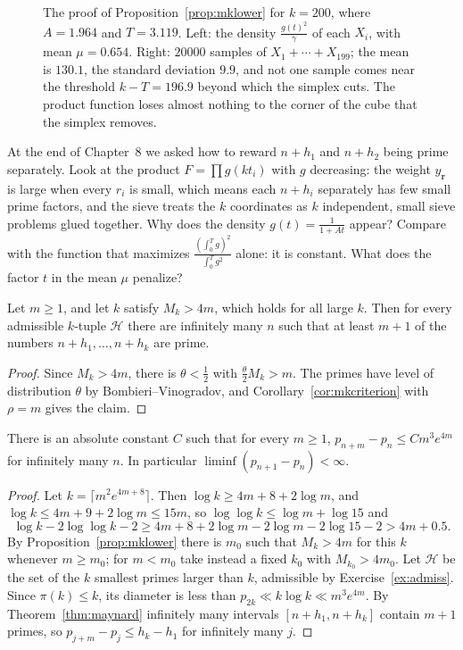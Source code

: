 \begin{figure}[ht]
\centering
{}
\caption{The proof of Proposition~\ref{prop:mklower} for $k=200$, where $A=1.964$ and $T=3.119$. Left: the density $\frac{g(t)^2}\gamma$ of each $X_i$, with mean $\mu=0.654$. Right: $20000$ samples of $X_1+\cdots+X_{199}$; the mean is $130.1$, the standard deviation $9.9$, and not one sample comes near the threshold $k-T=196.9$ beyond which the simplex cuts. The product function loses almost nothing to the corner of the cube that the simplex removes.}
\label{fig:chance}
\end{figure}

\begin{think}
At the end of Chapter~8 we asked how to reward $n+h_1$ and $n+h_2$ being prime separately. Look at the product $F=\prod g(kt_i)$ with $g$ decreasing: the weight $y_{\mathbf r}$ is large when every $r_i$ is small, which means each $n+h_i$ separately has few small prime factors, and the sieve treats the $k$ coordinates as $k$ independent, small sieve problems glued together. Why does the density $g(t)=\frac1{1+At}$ appear? Compare with the function that maximizes $\frac{(\int_0^Tg)^2}{\int_0^Tg^2}$ alone: it is constant. What does the factor $t$ in the mean $\mu$ penalize?
\end{think}

\begin{theorem}[Maynard, 2013]\label{thm:maynard}
Let $m\ge1$, and let $k$ satisfy $M_k>4m$, which holds for all large $k$. Then for every admissible $k$-tuple $\mathcal H$ there are infinitely many $n$ such that at least $m+1$ of the numbers $n+h_1,\dots,n+h_k$ are prime.
\end{theorem}
\begin{proof}
Since $M_k>4m$, there is $\theta<\frac12$ with $\frac\theta2M_k>m$. The primes have level of distribution $\theta$ by Bombieri--Vinogradov, and Corollary~\ref{cor:mkcriterion} with $\rho=m$ gives the claim.
\end{proof}

\begin{corollary}\label{cor:mprimes}
There is an absolute constant $C$ such that for every $m\ge1$, $p_{n+m}-p_n\le Cm^3e^{4m}$ for infinitely many $n$. In particular $\liminf(p_{n+1}-p_n)<\infty$.
\end{corollary}
\begin{proof}
Let $k=\lceil m^2e^{4m+8}\rceil$. Then $\log k\ge4m+8+2\log m$, and $\log k\le4m+9+2\log m\le15m$, so $\log\log k\le\log m+\log15$ and
\[
\log k-2\log\log k-2\ge4m+8+2\log m-2\log m-2\log15-2>4m+0.5.
\]
By Proposition~\ref{prop:mklower} there is $m_0$ such that $M_k>4m$ for this $k$ whenever $m\ge m_0$; for $m<m_0$ take instead a fixed $k_0$ with $M_{k_0}>4m_0$. Let $\mathcal H$ be the set of the $k$ smallest primes larger than $k$, admissible by Exercise~\ref{ex:admiss}. Since $\pi(k)\le k$, its diameter is less than $p_{2k}\ll k\log k\ll m^3e^{4m}$. By Theorem~\ref{thm:maynard} infinitely many intervals $[n+h_1,n+h_k]$ contain $m+1$ primes, so $p_{j+m}-p_j\le h_k-h_1$ for infinitely many $j$.
\end{proof}

